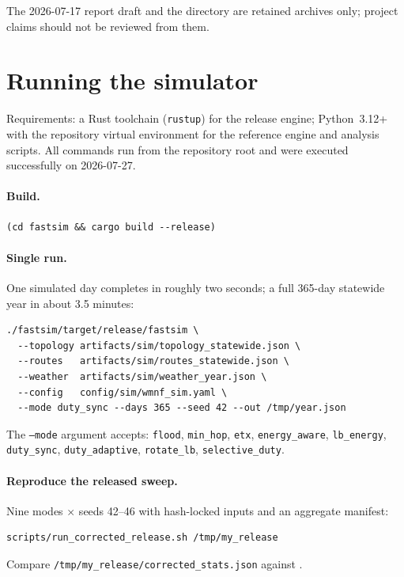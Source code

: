 \documentclass[11pt]{article}
\newcommand{\code}[1]{\texttt{\small #1}}
\begin{document}
The 2026-07-17 report draft and the  directory
are retained archives only; project claims should not be reviewed from them.

\section{Running the simulator}\label{s:running}

Requirements: a Rust toolchain (\code{rustup}) for the release engine;
Python~3.12+ with the repository virtual environment for the reference engine
and analysis scripts. All commands run from the repository root and were
executed successfully on 2026-07-27.

\paragraph{Build.}
\begin{verbatim}
(cd fastsim && cargo build --release)
\end{verbatim}

\paragraph{Single run.} One simulated day completes in roughly two seconds; a
full 365-day statewide year in about 3.5 minutes:
\begin{verbatim}
./fastsim/target/release/fastsim \
  --topology artifacts/sim/topology_statewide.json \
  --routes   artifacts/sim/routes_statewide.json \
  --weather  artifacts/sim/weather_year.json \
  --config   config/sim/wmnf_sim.yaml \
  --mode duty_sync --days 365 --seed 42 --out /tmp/year.json
\end{verbatim}
The \code{--mode} argument accepts: \code{flood}, \code{min\_hop},
\code{etx}, \code{energy\_aware}, \code{lb\_energy}, \code{duty\_sync},
\code{duty\_adaptive}, \code{rotate\_lb}, \code{selective\_duty}.

\paragraph{Reproduce the released sweep.} Nine modes $\times$ seeds 42--46
with hash-locked inputs and an aggregate manifest:
\begin{verbatim}
scripts/run_corrected_release.sh /tmp/my_release
\end{verbatim}
Compare \code{/tmp/my\_release/corrected\_stats.json} against
.
\end{document}
